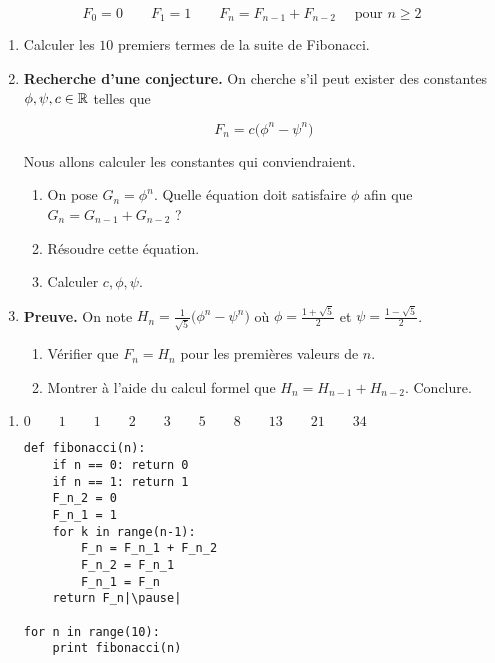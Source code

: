 \begin{frame}
$$F_0 = 0 \qquad F_1 = 1 \qquad F_{n} = F_{n-1} + F_{n-2} \quad \text{ pour } n\ge 2$$
  \vspace*{-2ex}
\pause
\begin{tp}
\begin{enumerate}
  \item Calculer les $10$ premiers termes de la suite de Fibonacci.
  \item \textbf{Recherche d'une conjecture.} On cherche s'il peut exister 
  des constantes $\phi,\psi,c \in \mathbb{R}$ telles que
  
  \vspace*{-2ex}
  $$F_n = c \big(\phi^n-\psi^n\big)$$
  \vspace*{-4ex}
  

  Nous allons calculer les constantes qui conviendraient.
   \begin{enumerate}
    \item On pose $G_n = \phi^n$. Quelle équation doit satisfaire $\phi$
    afin que $G_{n} = G_{n-1}+G_{n-2}$ ?
    \item Résoudre cette équation.
    \item Calculer $c,\phi,\psi$.
  \end{enumerate}
  
  \item \textbf{Preuve.} On note $H_n = \frac{1}{\sqrt{5}}  \big(\phi^n-\psi^n\big)$
  où $\phi = \frac{1+\sqrt5}{2}$ et $\psi=\frac{1-\sqrt5}{2}$.
  \begin{enumerate}
    \item Vérifier que $F_n=H_n$ pour les premières valeurs de $n$.
    \item Montrer à l'aide du calcul formel que $H_{n} = H_{n-1}+H_{n-2}$. Conclure.
  \end{enumerate}  
\end{enumerate}
\end{tp}

\end{frame}


\begin{frame}[fragile]
\begin{enumerate}
  \item $0 \qquad 1 \qquad 1 \qquad 2 \qquad 3 \qquad 5 \qquad 8 \qquad 13 \qquad 21 
\qquad 34 $
  
\pause

\begin{algo}
\begin{lstlisting}
def fibonacci(n):
    if n == 0: return 0
    if n == 1: return 1        
    F_n_2 = 0
    F_n_1 = 1
    for k in range(n-1):
        F_n = F_n_1 + F_n_2        
        F_n_2 = F_n_1
        F_n_1 = F_n
    return F_n|\pause|
    
for n in range(10):
    print fibonacci(n)    
\end{lstlisting}
\end{algo}

\end{enumerate}

\end{frame}


